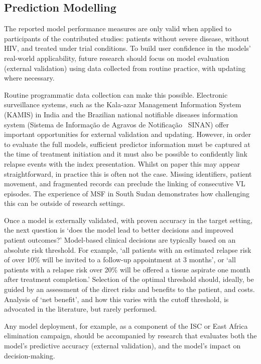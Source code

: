 \subsection{Prediction Modelling}

The reported model performance measures are only valid when applied to participants of the contributed studies: patients without severe disease, without HIV, and treated under trial conditions. To build user confidence in the models' real-world applicability, future research should focus on model evaluation (external validation) using data collected from routine practice, with updating where necessary\cite{riley2024A}.

Routine programmatic data collection can make this possible. Electronic surveillance systems, such as the Kala-azar Management Information System (KAMIS) in India\cite{bindroo2021} and the Brazilian national notifiable diseases information system (Sistema de Informação de Agravos de Notificação \textemdash\ SINAN)\cite{assefa2026} offer important opportunities for external validation and updating. However, in order to evaluate the full models, sufficient predictor information must be captured at the time of treatment initiation and it must also be possible to confidently link relapse events with the index presentation. Whilst on paper this may appear straightforward, in practice this is often not the case. Missing identifiers, patient movement, and fragmented records can preclude the linking of consecutive VL episodes. The experience of MSF in South Sudan demonstrates how challenging this can be outside of research settings\cite{naylor-leyland2022}.

Once a model is externally validated, with proven accuracy in the target setting, the next question is `does the model lead to better decisions and improved patient outcomes?' Model-based clinical decisions are typically based on an absolute risk threshold. For example, `all patients with an estimated relapse risk of over 10\% will be invited to a follow-up appointment at 3 months', or `all patients with a relapse risk over 20\% will be offered a tissue aspirate one month after treatment completion.' Selection of the optimal threshold should, ideally, be guided by an assessment of the direct risks and benefits to the patient, and costs. Analysis of `net benefit', and how this varies with the cutoff threshold, is advocated in the literature, but rarely performed\cite{vickers2016}.

Any model deployment, for example, as a component of the ISC or East Africa elimination campaign, should be accompanied by research that evaluates both the model's predictive accuracy (external validation), and the model's impact on decision-making.

